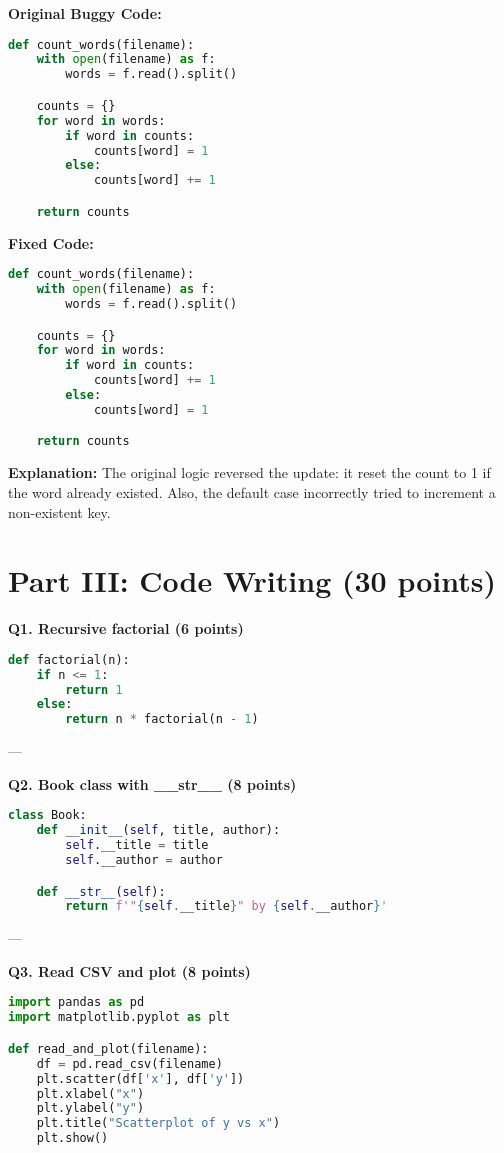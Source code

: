\documentclass[12pt]{article}
\begin{document}
\textbf{Original Buggy Code:}
\begin{lstlisting}[language=Python]
def count_words(filename):
    with open(filename) as f:
        words = f.read().split()

    counts = {}
    for word in words:
        if word in counts:
            counts[word] = 1
        else:
            counts[word] += 1

    return counts
\end{lstlisting}

\textbf{Fixed Code:}
\begin{lstlisting}[language=Python]
def count_words(filename):
    with open(filename) as f:
        words = f.read().split()

    counts = {}
    for word in words:
        if word in counts:
            counts[word] += 1
        else:
            counts[word] = 1

    return counts
\end{lstlisting}

\textbf{Explanation:}  
The original logic reversed the update: it reset the count to 1 if the word already existed. Also, the default case incorrectly tried to increment a non-existent key.

\newpage
\section*{Part III: Code Writing (30 points)}

\textbf{Q1. Recursive factorial (6 points)}
\begin{lstlisting}[language=Python]
def factorial(n):
    if n <= 1:
        return 1
    else:
        return n * factorial(n - 1)
\end{lstlisting}

---

\textbf{Q2. Book class with \_\_str\_\_ (8 points)}
\begin{lstlisting}[language=Python]
class Book:
    def __init__(self, title, author):
        self.__title = title
        self.__author = author

    def __str__(self):
        return f'"{self.__title}" by {self.__author}'
\end{lstlisting}

---

\textbf{Q3. Read CSV and plot (8 points)}
\begin{lstlisting}[language=Python]
import pandas as pd
import matplotlib.pyplot as plt

def read_and_plot(filename):
    df = pd.read_csv(filename)
    plt.scatter(df['x'], df['y'])
    plt.xlabel("x")
    plt.ylabel("y")
    plt.title("Scatterplot of y vs x")
    plt.show()
\end{lstlisting}
\end{document}

